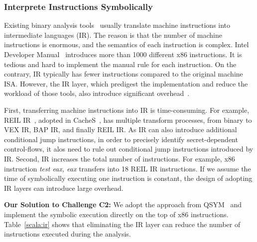 \subsubsection{Interprete Instructions Symbolically}
Existing binary analysis tools~\cite{shoshitaishvili2016state,
10.1007/978-3-642-22110-1_37} usually translate machine instructions into
intermediate languages (IR). The reason is that the number of machine instructions is
enormous, and the semantics of each instruction is complex. Intel Developer
Manual~\cite{intelsys} introduces more than 1000 different x86 instructions. It
is tedious and hard to implement the manual rule for each instruction. 
On the contrary,
IR typically has fewer instructions compared to the original machine ISA\@.
However, the IR layer, which predigest the implementation
and reduce the workload of those tools, also introduce significant
overhead~\cite{217563}.

First, transferring machine instructions into IR is time-consuming. For example,
REIL IR~\cite{dullien2009reil}, adopted in CacheS~\cite{236338}, has multiple
transform processes, from binary to VEX IR, BAP IR, and finally REIL IR\@. As IR
can also introduce additional conditional jump instructions, in order to
precisely identify secret-dependent control-flows, it alos need to rule out
conditional jump instructions introduced by IR.
Second, IR increases the total number of instructions. For example, x86
instruction \textit{test eax, eax} transfers into 18 REIL IR instructions. If we
assume the time of symbolically executing one instruction is constant, the
design of adopting IR layers can introduce large overhead.

\vspace*{2pt}
\textbf{Our Solution to Challenge C2:}
We adopt the approach from QSYM~\cite{217563} and implement the symbolic execution
directly on the top of x86 instructions. Table~\ref{scala:ir} shows that
eliminating the IR layer can reduce the number of instructions executed during
the analysis.

